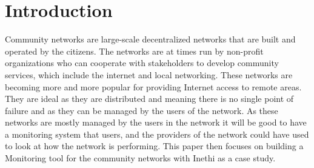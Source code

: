 \section{Introduction}\label{sec:introduction}
Community networks are large-scale decentralized networks that are built and operated by the citizens\cite{Selimi:2014:TAD:2723218.2723265}.
The networks are at times run by non-profit organizations who can cooperate with stakeholders to develop community services, which include the internet and local networking\cite{Braem:2013:CRC:2500098.2500108}.
These networks are becoming more and more popular for providing Internet access to remote areas.
They are ideal as they are distributed and meaning there is no single point of failure and  as they can be managed by the users of the network.
As these networks are mostly managed by the users in the network it will be good to have a monitoring system that users, and the providers of the network could have used to look at how the network is performing.
This paper then focuses on building a Monitoring tool for the community networks with Inethi as a case study.